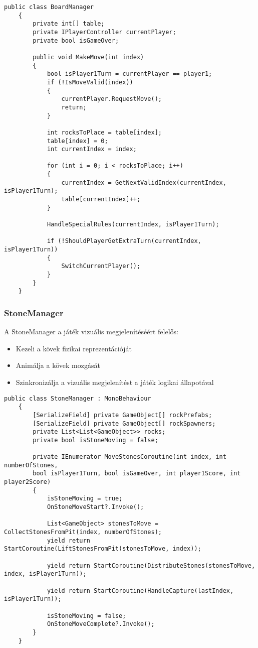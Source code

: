 \begin{lstlisting}[language={[Sharp]C}]
	public class BoardManager
	{
		private int[] table;
		private IPlayerController currentPlayer;
		private bool isGameOver;
		
		public void MakeMove(int index)
		{
			bool isPlayer1Turn = currentPlayer == player1;
			if (!IsMoveValid(index))
			{
				currentPlayer.RequestMove();
				return;
			}
			
			int rocksToPlace = table[index];
			table[index] = 0;
			int currentIndex = index;
			
			for (int i = 0; i < rocksToPlace; i++)
			{
				currentIndex = GetNextValidIndex(currentIndex, isPlayer1Turn);
				table[currentIndex]++;
			}
			
			HandleSpecialRules(currentIndex, isPlayer1Turn);
			
			if (!ShouldPlayerGetExtraTurn(currentIndex, isPlayer1Turn))
			{
				SwitchCurrentPlayer();
			}
		}
	}
\end{lstlisting}

\subsubsection{StoneManager}
A StoneManager a játék vizuális megjelenítéséért felelős:
\begin{itemize}
	\item Kezeli a kövek fizikai reprezentációját
	\item Animálja a kövek mozgását
	\item Szinkronizálja a vizuális megjelenítést a játék logikai állapotával
\end{itemize}

\begin{lstlisting}[language={[Sharp]C}]
	public class StoneManager : MonoBehaviour
	{
		[SerializeField] private GameObject[] rockPrefabs;
		[SerializeField] private GameObject[] rockSpawners;
		private List<List<GameObject>> rocks;
		private bool isStoneMoving = false;
		
		private IEnumerator MoveStonesCoroutine(int index, int numberOfStones, 
		bool isPlayer1Turn, bool isGameOver, int player1Score, int player2Score)
		{
			isStoneMoving = true;
			OnStoneMoveStart?.Invoke();
			
			List<GameObject> stonesToMove = CollectStonesFromPit(index, numberOfStones);
			yield return StartCoroutine(LiftStonesFromPit(stonesToMove, index));
			
			yield return StartCoroutine(DistributeStones(stonesToMove, index, isPlayer1Turn));
			
			yield return StartCoroutine(HandleCapture(lastIndex, isPlayer1Turn));
			
			isStoneMoving = false;
			OnStoneMoveComplete?.Invoke();
		}
	}
\end{lstlisting}

